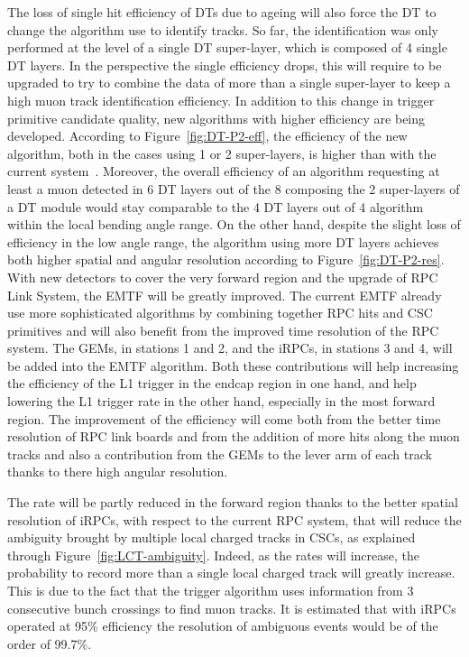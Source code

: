 	The loss of single hit efficiency of DTs due to ageing will also force the DT to change the algorithm use to identify tracks. So far, the identification was only performed at the level of a single DT super-layer, which is composed of 4 single DT layers. In the perspective the single efficiency drops, this will require to be upgraded to try to combine the data of more than a single super-layer to keep a high muon track identification efficiency. In addition to this change in trigger primitive candidate quality, new algorithms with higher efficiency are being developed. According to Figure~\ref{fig:DT-P2-eff}, the efficiency of the new algorithm, both in the cases using 1 or 2 super-layers, is higher than with the current system~\cite{CMS2013}. Moreover, the overall efficiency of an algorithm requesting at least a muon detected in 6 DT layers out of the 8 composing the 2 super-layers of a DT module would stay comparable to the 4 DT layers out of 4 algorithm within the local bending angle range. On the other hand, despite the slight loss of efficiency in the low angle range, the algorithm using more DT layers achieves both higher spatial and angular resolution according to Figure~\ref{fig:DT-P2-res}.\\
	
	With new detectors to cover the very forward region and the upgrade of RPC Link System, the EMTF will be greatly improved. The current EMTF already use more sophisticated algorithms by combining together RPC hits and CSC primitives and will also benefit from the improved time resolution of the RPC system. The GEMs, in stations 1 and 2, and the iRPCs, in stations 3 and 4, will be added into the EMTF algorithm. Both these contributions will help increasing the efficiency of the L1 trigger in the endcap region in one hand, and help lowering the L1 trigger rate in the other hand, especially in the most forward region. The improvement of the efficiency will come both from the better time resolution of RPC link boards and from the addition of more hits along the muon tracks and also a contribution from the GEMs to the lever arm of each track thanks to there high angular resolution.
	
	The rate will be partly reduced in the forward region thanks to the better spatial resolution of iRPCs, with respect to the current RPC system, that will reduce the ambiguity brought by multiple local charged tracks in CSCs, as explained through Figure~\ref{fig:LCT-ambiguity}. Indeed, as the rates will increase, the probability to record more than a single local charged track will greatly increase. This is due to the fact that the trigger algorithm uses information from 3 consecutive bunch crossings to find muon tracks. It is estimated that with iRPCs operated at 95\% efficiency the resolution of ambiguous events would be of the order of 99.7\%.
	
